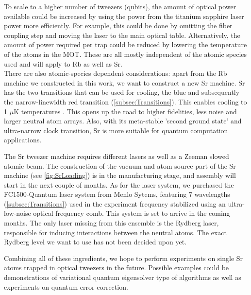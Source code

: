To scale to a higher number of tweezers (qubits), the amount of optical power available could be increased by using the power from the titanium sapphire laser power more efficiently. 
For example, this could be done by omitting the fiber coupling step and moving the laser to the main optical table. 
Alternatively, the amount of power required per trap could be reduced by lowering the temperature of the atoms in the MOT. 
These are all mostly independent of the atomic species used and will apply to Rb as well as Sr. \\

\noindent There are also atomic-species dependent considerations: apart from the Rb machine we constructed in this work, we want to construct a new Sr machine.
Sr has the two transitions that can be used for cooling, the blue and subsequently the narrow-linewidth red transition (\cref{subsec:Transitions}).
This enables cooling to 1 $\mu$K temperatures \cite{Stellmer2013}.
This opens up the road to higher fidelities, less noise and larger neutral atom arrays. 
Also, with its meta-stable 'second ground state' and ultra-narrow clock transition, Sr is more suitable for quantum computation applications.

The Sr tweezer machine requires different lasers as well as a Zeeman slowed atomic beam. 
The construction of the vacuum and atom source part of the Sr machine (see \cref{fig:SrLoading}) is in the manufacturing stage, and assembly will start in the next couple of months. 
As for the laser system, we purchased the FC1500-Quantum laser system from Menlo Sytems, featuring 7 wavelengths (\cref{subsec:Transitions}) used in the experiment frequency stabilized using an ultra-low-noise optical frequency comb.
This system is set to arrive in the coming months.
The only laser missing from this ensemble is the Rydberg laser, responsible for inducing interactions between the neutral atoms.
The exact Rydberg level we want to use has not been decided upon yet. 

Combining all of these ingredients, we hope to perform experiments on single Sr atoms trapped in optical tweezers in the future.
Possible examples could be demonstrations of variational quantum eigensolver type of algorithms as well as experiments on quantum error correction. 




